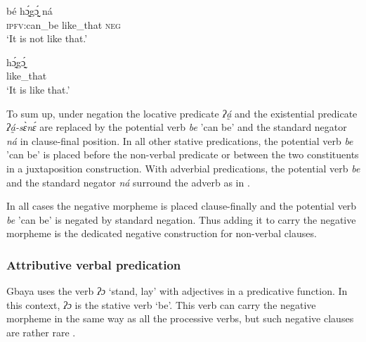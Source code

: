 \documentclass[output=paper,colorlinks=true, citecolor=brown]{langscibook}
\begin{document}
\ea\label{ex:gba:52}
    \gll  bé hɔ̰́gɔ̰̰́ ná  \\ 
         \textsc{ipfv}:can\_be like\_that \textsc{neg}  \\
    \glt ‘It is not like that.’
\z 

\ea\label{ex:gba:53}
    \gll hɔ̰́gɔ̰̰́  \\ 
         like\_that  \\
    \glt ‘It is like that.’
\z 

To sum up, under negation the locative predicate \textit{ʔá̰} and the existential predicate  \textit{ʔá̰-sɛ̀nɛ́} are replaced by the potential verb \textit{be} ’can be’ and the standard negator \textit{ná} in clause-final position. In all other stative predications, the potential verb \textit{be} ’can be’ is placed before the non-verbal predicate or between the two constituents in a juxtaposition construction. With adverbial predications, the potential verb \textit{be} and the standard negator \textit{ná} surround the adverb as in .

In all cases the negative morpheme is placed clause-finally and the potential verb \textit{be} 'can be' is negated by standard negation. Thus adding it to carry the negative morpheme is the dedicated negative construction for non-verbal clauses.


\subsubsection{Attributive verbal predication}\label{sec:gba:2.3.3}

Gbaya uses the verb \textit{ʔɔ} ‘stand, lay’ with adjectives in a predicative function. In this context, \textit{ʔɔ} is the stative verb ‘be’. 
This verb can carry the negative morpheme in the same way as all the processive verbs, but such negative clauses are rather rare . 
\end{document}
